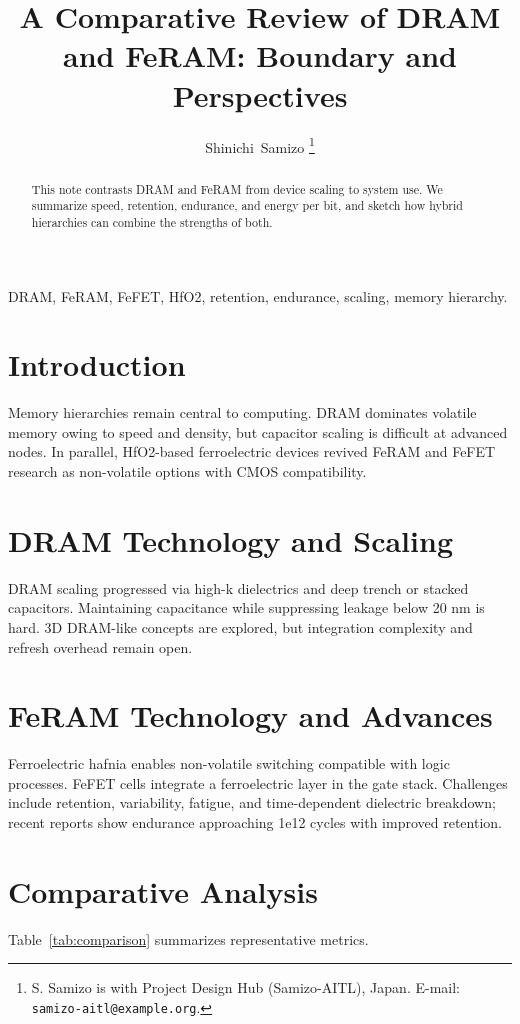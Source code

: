 \documentclass[journal]{IEEEtran}
\title{A Comparative Review of DRAM and FeRAM: Boundary and Perspectives}
\author{Shinichi~Samizo%
\thanks{S. Samizo is with Project Design Hub (Samizo-AITL), Japan. E-mail: \texttt{samizo-aitl@example.org}.}
}
\begin{document}
\maketitle

\begin{abstract}
This note contrasts DRAM and FeRAM from device scaling to system use. We summarize speed, retention, endurance, and energy per bit, and sketch how hybrid hierarchies can combine the strengths of both.
\end{abstract}

\begin{IEEEkeywords}
DRAM, FeRAM, FeFET, HfO2, retention, endurance, scaling, memory hierarchy.
\end{IEEEkeywords}

\section{Introduction}
Memory hierarchies remain central to computing. DRAM dominates volatile memory owing to speed and density, but capacitor scaling is difficult at advanced nodes. In parallel, HfO2-based ferroelectric devices revived FeRAM and FeFET research as non-volatile options with CMOS compatibility.

\section{DRAM Technology and Scaling}
DRAM scaling progressed via high-k dielectrics and deep trench or stacked capacitors. Maintaining capacitance while suppressing leakage below 20 nm is hard. 3D DRAM-like concepts are explored, but integration complexity and refresh overhead remain open.

\section{FeRAM Technology and Advances}
Ferroelectric hafnia enables non-volatile switching compatible with logic processes. FeFET cells integrate a ferroelectric layer in the gate stack. Challenges include retention, variability, fatigue, and time-dependent dielectric breakdown; recent reports show endurance approaching 1e12 cycles with improved retention.

\section{Comparative Analysis}
Table~\ref{tab:comparison} summarizes representative metrics. %
\end{document}

